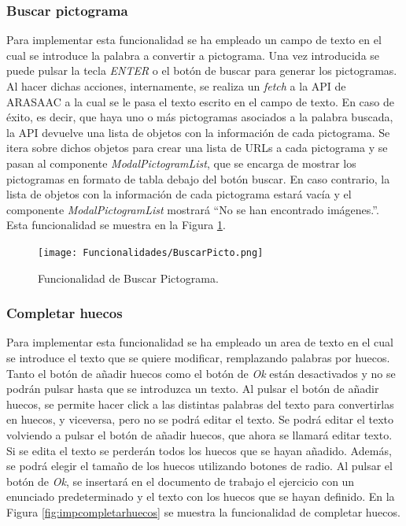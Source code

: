 \subsubsection{Buscar pictograma}
Para implementar esta funcionalidad se ha empleado un campo de texto en el cual se introduce la palabra a convertir a pictograma. Una vez introducida se puede pulsar la tecla \textit{ENTER} o el botón de buscar para generar los pictogramas. Al hacer dichas acciones, internamente, se realiza un \textit{fetch} a la API de ARASAAC a la cual se le pasa el texto escrito en el campo de texto. En caso de éxito, es decir, que haya uno o más pictogramas asociados a la palabra buscada, la API devuelve una lista de objetos con la información de cada pictograma. Se itera sobre dichos objetos para crear una lista de URLs a cada pictograma y se pasan al componente \textit{ModalPictogramList}, que se encarga de mostrar los pictogramas en formato de tabla debajo del botón buscar. En caso contrario, la lista de objetos con la información de cada pictograma estará vacía y el componente \textit{ModalPictogramList} mostrará ``No se han encontrado imágenes.''. Esta funcionalidad se muestra en la Figura \ref{fig:buscarPictograma}.

\begin{figure}[ht!]
  \centering
  \texttt{[image: Funcionalidades/BuscarPicto.png]}
  \caption{Funcionalidad de Buscar Pictograma.}
  \label{fig:buscarPictograma}
\end{figure}

\subsubsection{Completar huecos}
\label{sec:impcompletarhuecos}
Para implementar esta funcionalidad se ha empleado un area de texto en el cual se introduce el texto que se quiere modificar, remplazando palabras por huecos. Tanto el botón de añadir huecos como el botón de \textit{Ok} están desactivados y no se podrán pulsar hasta que se introduzca un texto. Al pulsar el botón de añadir huecos, se permite hacer click a las distintas palabras del texto para convertirlas en huecos, y viceversa, pero no se podrá editar el texto. Se podrá editar el texto volviendo a pulsar el botón de añadir huecos, que ahora se llamará editar texto. Si se edita el texto se perderán todos los huecos que se hayan añadido. Además, se podrá elegir el tamaño de los huecos utilizando botones de radio. Al pulsar el botón de \textit{Ok}, se insertará en el documento de trabajo el ejercicio con un enunciado predeterminado y el texto con los huecos que se hayan definido. En la Figura \ref{fig:impcompletarhuecos} se muestra la funcionalidad de completar huecos.

